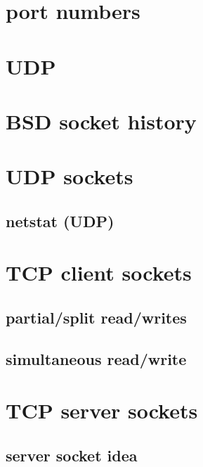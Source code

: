 \section{port numbers}


\section{UDP}


\section{BSD socket history}


\section{UDP sockets}


\subsection{netstat (UDP)}


\section{TCP client sockets}
 

\subsection{partial/split read/writes}



\subsection{simultaneous read/write}


\section{TCP server sockets}
\subsection{server socket idea}


